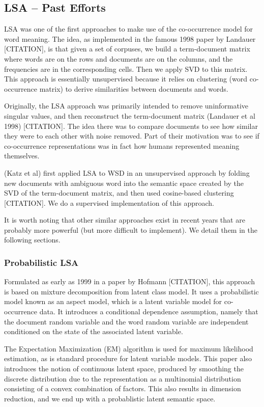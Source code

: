 \documentclass[10pt, letterpaper]{article}
\begin{document}
 	\subsection{LSA -- Past Efforts}
 	LSA was one of the first approaches to make use of the co-occurrence model for word meaning. The idea, as implemented in the famous 1998 paper by Landauer [CITATION], is that given a set of corpuses, we build a term-document matrix where words are on the rows and documents are on the columns, and the frequencies are in the corresponding cells.
	Then we apply SVD to this matrix. 
	This approach is essentially unsupervised because it relies on clustering (word co-occurrence matrix) to derive similarities between documents and words. 

	Originally, the LSA approach was primarily intended to remove uninformative singular values, and then reconstruct the term-document matrix (Landauer et al 1998) [CITATION].  The idea there was to compare documents to see how similar they were to each other with noise removed. Part of their motivation was to see if co-occurrence representations was in fact how humans represented meaning themselves.

	(Katz et al) first applied LSA to WSD in an unsupervised approach by folding new documents with ambiguous word into the semantic space created by the SVD of the term-document matrix, and then used cosine-based clustering [CITATION]. We do a supervised implementation of this approach. 

	It is worth noting that other similar approaches exist in recent years that are probably more powerful (but more difficult to implement). We detail them in the following sections. 

	\subsubsection{Probabilistic LSA}

	Formulated as early as 1999 in a paper by Hofmann [CITATION], this approach is based on mixture decomposition from latent class model. It uses a probabilistic model known as an aspect model, which is a latent variable model for co-occurrence data. It introduces a conditional dependence assumption, namely that the document random variable and the word random variable are independent conditioned on the state of the associated latent variable. 
	
	The Expectation Maximization (EM) algorithm is used for maximum likelihood estimation, as is standard procedure for latent variable models. This paper also introduces the notion of continuous latent space, produced by smoothing the discrete distribution due to the representation as a multinomial distribution
	consisting of a convex combination of factors. This also results in dimension reduction, and we end up with a probablistic latent semantic space. 
\end{document}
